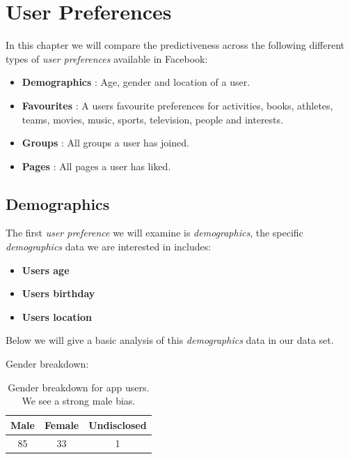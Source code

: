 
\chapter{User Preferences}
\label{cha:ivg}

In this chapter we will compare the predictiveness across the following different types of \emph{user preferences} available
in Facebook:
\begin{itemize}
\item \textbf{Demographics} : Age, gender and location of a user.
\item \textbf{Favourites} : A users favourite preferences for activities, books, athletes, teams, movies, music, sports, television, people and interests.
\item \textbf{Groups} : All groups a user has joined.
\item \textbf{Pages} :  All pages a user has liked.
\end{itemize}

\section{Demographics}
\label{sec:demo}

The first \emph{user preference} we will examine is \emph{demographics}, the specific \emph{demographics} data we are interested in includes:
\begin{itemize}
\item \textbf{Users age}
\item \textbf{Users birthday}
\item \textbf{Users location}
\end{itemize}

Below we will give a basic analysis of this \emph{demographics} data in our data set.

Gender breakdown:

\begin{table}[!htbp]
\centering
	\begin{tabular}{|c|c|c|} %
		\hline
		\textbf{Male} & \textbf{Female} & \textbf{Undisclosed}  \\ \hline
		85 & 33 & 1 \\ \hline
	\end{tabular}
	\caption{Gender breakdown for app users. We see a strong male bias.}
	\label{tab:revpol}
\end{table}


